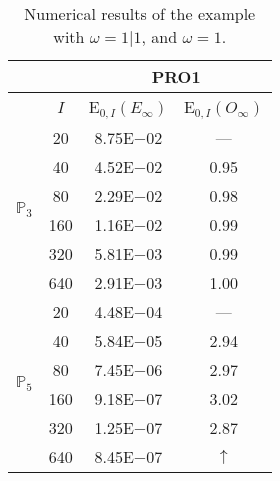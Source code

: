\begin{table}[H]
\caption{Numerical results of the example with $\omega=1|1$, and $\omega=1$.}
\setlength{\tabcolsep}{5pt}
\centering
\begin{tabular}{@{}l c c c@{}}
\toprule
 &  & \multicolumn{2}{c}{PRO1}\\
\midrule
 & $I$ & E$_{0,I}(E_{\infty})$ & E$_{0,I}(O_{\infty})$\\
\midrule
\multirow{6}{*}{$\mathbb{P}_{3}$}
 & 20 & 8.75E$-$02 & ---\\
 & 40 & 4.52E$-$02 & 0.95\\
 & 80 & 2.29E$-$02 & 0.98\\
 & 160 & 1.16E$-$02 & 0.99\\
 & 320 & 5.81E$-$03 & 0.99\\
 & 640 & 2.91E$-$03 & 1.00\\
\midrule
\multirow{6}{*}{$\mathbb{P}_{5}$}
 & 20 & 4.48E$-$04 & ---\\
 & 40 & 5.84E$-$05 & 2.94\\
 & 80 & 7.45E$-$06 & 2.97\\
 & 160 & 9.18E$-$07 & 3.02\\
 & 320 & 1.25E$-$07 & 2.87\\
 & 640 & 8.45E$-$07 & $\uparrow$\\
\bottomrule
\end{tabular}
\label{Table:PRO:test_01_01_test39_pro1}
\end{table}
